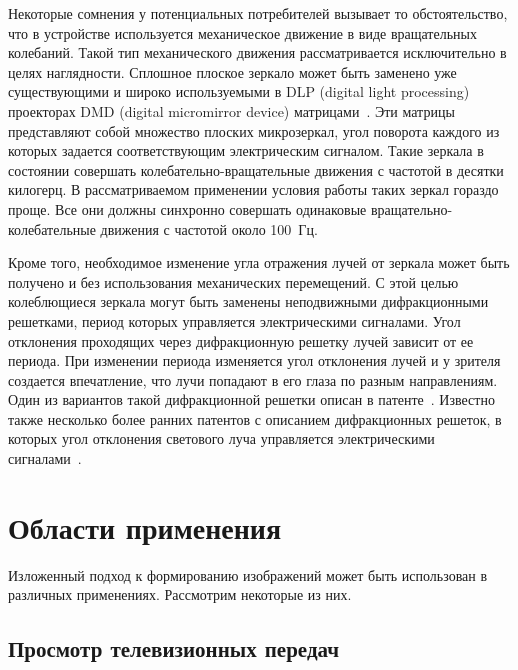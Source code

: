\begin{multicols}{2}
  Некоторые сомнения у потенциальных потребителей вызывает то обстоятельство, что в 
устройстве используется механическое движение в виде вращательных колебаний. Такой 
тип механического движения рассматривается исключительно в целях наглядности. 
Сплошное плоское зеркало может быть заменено уже существующими и широко 
используемыми в DLP (digital light processing) проекторах DMD (digital micromirror device) матрицами~\cite{3t}. Эти 
матрицы пред\-став\-ля\-ют собой множество плоских микрозеркал, угол поворота каждого из 
которых задается соответствующим электрическим сигналом. Такие зеркала в состоянии 
совершать колебательно-вращательные движения с частотой в десятки килогерц. 
   В рассматриваемом применении условия работы таких зеркал гораздо проще. Все они 
должны синхронно совершать одинаковые вращательно-колебательные движения с 
частотой около 100~Гц. 

  
  Кроме того, необходимое изменение угла отражения лучей от зеркала может быть 
получено и без использования механических перемещений. С этой целью колеблющиеся 
зеркала могут быть заменены неподвижными дифракционными решетками, период 
которых управляется электрическими сигналами. Угол отклонения проходящих через 
дифракционную решетку лучей зависит от ее периода. При изменении периода 
изменяется угол отклонения лучей и у зрителя создается впечатление, что лучи попадают 
в его глаза по разным направлениям. Один из вариантов такой дифракционной решетки 
описан в патенте~\cite{4t}. Известно также несколько более ранних патентов с описанием 
дифракционных решеток, в которых угол отклонения светового луча управляется 
электрическими сигналами~\cite{5t}. 


\section{Области применения }


  Изложенный подход к формированию изображений может быть использован в 
различных применениях. Рассмотрим некоторые из них. 


\subsection{Просмотр телевизионных передач}
  

\end{multicols}
